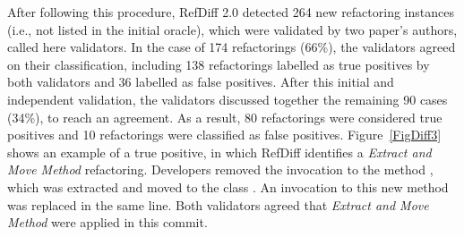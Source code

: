 After following this procedure, RefDiff 2.0 detected 264 new refactoring instances (i.e., not listed in the initial oracle), which were validated by two paper's authors, called here validators. In the case of 174 refactorings (66\%), the validators agreed on their classification, including 138 refactorings labelled as true positives by both validators and 36 labelled as false positives. After this initial and independent validation, the validators discussed together the remaining 90 cases (34\%), to reach an agreement. As a result, 80 refactorings were considered true positives and 10 refactorings were classified as false positives.
Figure~\ref{FigDiff3} shows an example of a true positive, in which RefDiff identifies a \emph{Extract and Move Method} refactoring. Developers removed the invocation to the method , which was extracted and moved to the class . An invocation to this new method  was replaced in the same line.
Both validators agreed that \emph{Extract and Move Method} were applied in this commit.

